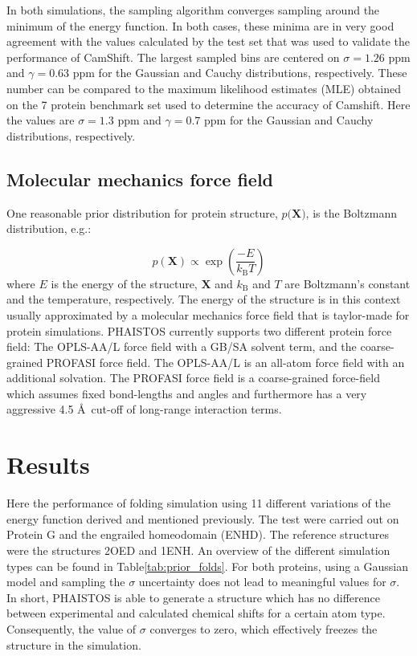 In both simulations, the sampling algorithm converges sampling around the minimum of the energy function.
In both cases, these minima are in very good agreement with the values calculated by the test set that was used to validate the performance of CamShift.
The largest sampled bins are centered on $\sigma = 1.26$ ppm and $\gamma = 0.63$ ppm for the Gaussian and Cauchy distributions, respectively.
These number can be compared to the maximum likelihood estimates (MLE) obtained on the 7 protein benchmark set used to determine the accuracy of Camshift.
Here the values are $\sigma = 1.3$ ppm and $\gamma = 0.7$ ppm for the Gaussian and Cauchy distributions, respectively.


\subsection{Molecular mechanics force field}

One reasonable prior distribution for protein structure, $p(\mathbf{X)}$, is the Boltzmann distribution, e.g.:

\begin{equation}
    p(\mathbf{X}) \propto \exp\left( \frac{-E}{k_\mathrm{B}T}\right)
\end{equation}
where $E$ is the energy of the structure, $\mathbf{X}$ and $k_\mathrm{B}$ and $T$ are Boltzmann's constant and the temperature, respectively.
The energy of the structure is in this context usually approximated by a molecular mechanics force field that is taylor-made for protein simulations. PHAISTOS currently supports two different protein force field: The OPLS-AA/L force field with a GB/SA solvent term, and the coarse-grained PROFASI force field. 
The OPLS-AA/L is an all-atom force field with an additional solvation. The PROFASI force field is a coarse-grained force-field which assumes fixed bond-lengths and angles and furthermore has a very aggressive 4.5 \AA~cut-off of long-range interaction terms.

\section{Results}

Here the performance of folding simulation using 11 different variations of the energy function derived and mentioned previously. The test were carried out on Protein G and the engrailed homeodomain (ENHD). The reference structures were the structures 2OED and 1ENH.
An overview of the different simulation types can be found in Table\ref{tab:prior_folds}.
For both proteins, using a Gaussian model and sampling the $\sigma$ uncertainty does not lead to meaningful values for $\sigma$.
In short, PHAISTOS is able to generate a structure which has no difference between experimental and calculated chemical shifts for a certain atom type.
Consequently, the value of $\sigma$ converges to zero, which effectively freezes the structure in the simulation.



